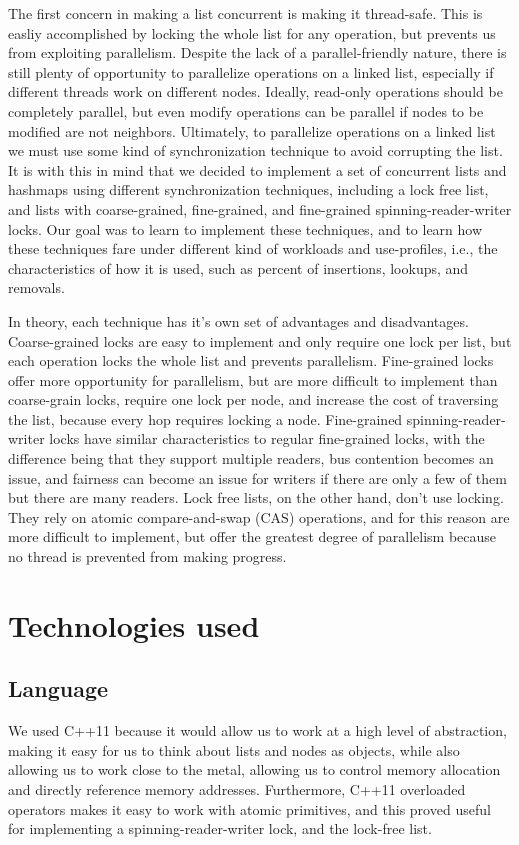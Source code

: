 \documentclass[11pt]{article}
\begin{document}
The first concern in making a list concurrent is making it thread-safe. This is
easliy accomplished by locking the whole list for any operation, but prevents us
from exploiting parallelism. Despite the lack of a parallel-friendly nature,
there is still plenty of opportunity to parallelize operations on a linked list,
especially if different threads work on different nodes. Ideally, read-only
operations should be completely parallel, but even modify operations can be
parallel if nodes to be modified are not neighbors. Ultimately, to parallelize
operations on a linked list we must use some kind of synchronization technique
to avoid corrupting the list. It is with this in mind that we decided to implement
a set of concurrent lists and hashmaps using different synchronization techniques,
including a lock free list, and lists with coarse-grained, fine-grained, and
fine-grained spinning-reader-writer locks. Our goal was to learn to implement
these techniques, and to learn how these techniques fare under different kind of
workloads and use-profiles, i.e., the characteristics of how it is used, such as
percent of insertions, lookups, and removals.

In theory, each technique has it's own set of advantages and disadvantages.
Coarse-grained locks are easy to implement and only require one lock per list,
but each operation locks the whole list and prevents parallelism. Fine-grained
locks offer more opportunity for parallelism, but are more difficult to
implement than coarse-grain locks, require one lock per node, and increase the
cost of traversing the list, because every hop requires locking a node.
Fine-grained spinning-reader-writer locks have similar characteristics to
regular fine-grained locks, with the difference being that they support multiple
readers, bus contention becomes an issue, and fairness can become an issue for
writers if there are only a few of them but there are many readers. Lock free
lists, on the other hand, don't use locking. They rely on atomic
compare-and-swap (CAS) operations, and for this reason are more difficult to
implement, but offer the greatest degree of parallelism because no thread is
prevented from making progress.

\section{Technologies used}
\subsection{Language}
We used C++11 because it would allow us to work at a high level of abstraction,
making it easy for us to think about lists and nodes as objects, while also
allowing us to work close to the metal, allowing us to control memory allocation
and directly reference memory addresses. Furthermore, C++11 overloaded operators
makes it easy to work with atomic primitives, and this proved useful for
implementing a spinning-reader-writer lock, and the lock-free list.
\end{document}
